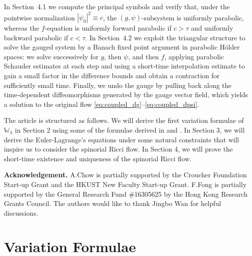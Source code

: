 \documentclass{amsart}
\theoremstyle{definition}
\theoremstyle{remark}
\numberwithin{equation}{section}
\begin{document}
In Section~4.1 we compute the principal symbols and verify that, under the pointwise normalization
$|\psi_0|^2\equiv c$, the $(g,\psi)$-subsystem is uniformly parabolic, whereas the $f$-equation is uniformly
forward parabolic if $c>\tau$ and uniformly backward parabolic if $c<\tau$. In Section~4.2 we exploit the
triangular structure to solve the gauged system by a Banach fixed point argument in parabolic H\"older
spaces: we solve successively for $g$, then $\psi$, and then $f$, applying parabolic Schauder estimates at
each step and using a short-time interpolation estimate to gain a small factor in the difference
bounds and obtain a contraction for sufficiently small time. Finally, we undo the gauge by pulling back
along the time-dependent diffeomorphisms generated by the gauge vector field, which yields a solution
to the original flow \eqref{eq:coupled_dg}--\eqref{eq:coupled_dpsi}.


The article is structured as follows. We will derive the first variation formulae of $\mathbb{W}_\lambda$ in Section 2 using some of the formulae derived in \cite{Perelman} and \cite{BO22,BO23}. In Section 3, we will derive the Euler-Lagrange's equations under some natural constraints that will inspire us to consider the spinorial Ricci flow. In Section 4, we will prove the short-time existence and uniqueness of the spinorial Ricci flow.

\medskip

\noindent\textbf{Acknowledgement.} A.Chow is partially supported by the Croucher Foundation Start-up Grant and the HKUST New Faculty Start-up Grant. 
F.Fong is partially supported by the General Research Fund \#16305625 by the Hong Kong Research Grants Council. The authors would like to thank Jingbo Wan for helpful discussions.


\section{Variation Formulae}
\end{document}
